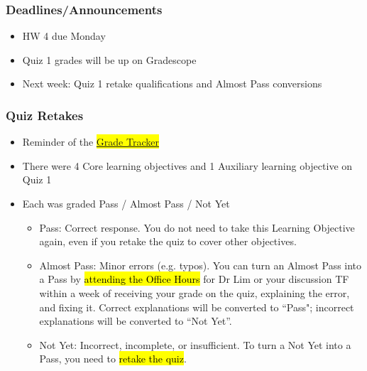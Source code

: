 
\begin{frame}
    \frametitle{Deadlines/Announcements}
\begin{itemize}
            \item HW 4 due Monday
            \item Quiz 1 grades will be up on Gradescope
            \item Next week: Quiz 1 retake qualifications and Almost Pass conversions
        \end{itemize}
\end{frame}
\begin{frame}
    \frametitle{Quiz Retakes}
    \begin{itemize}
        \item Reminder of the \hl{\href{https://docs.google.com/spreadsheets/d/1hIntYsX7ILDrF5V_REz1IhdlLGSvDO0usUIGHq-kH94/edit?gid=0#gid=0}{Grade Tracker}}
        \item There were 4 Core learning objectives and 1 Auxiliary learning objective on Quiz 1
        \item Each was graded Pass / Almost Pass / Not Yet
        \begin{itemize}
            \item Pass: Correct response. You do not need to take this Learning Objective again, even if you retake the quiz to cover other objectives.
            \item Almost Pass: Minor errors (e.g. typos). You can turn an Almost Pass into a Pass by \hl{attending the Office Hours} for Dr Lim or your discussion TF within a week of receiving your grade on the quiz, explaining the error, and fixing it. Correct explanations will be converted to ``Pass"; incorrect explanations will be converted to ``Not Yet''.
            \item Not Yet: Incorrect, incomplete, or insufficient. To turn a Not Yet into a Pass, you need to \hl{retake the quiz}.
        \end{itemize}
    \end{itemize}
\end{frame}

